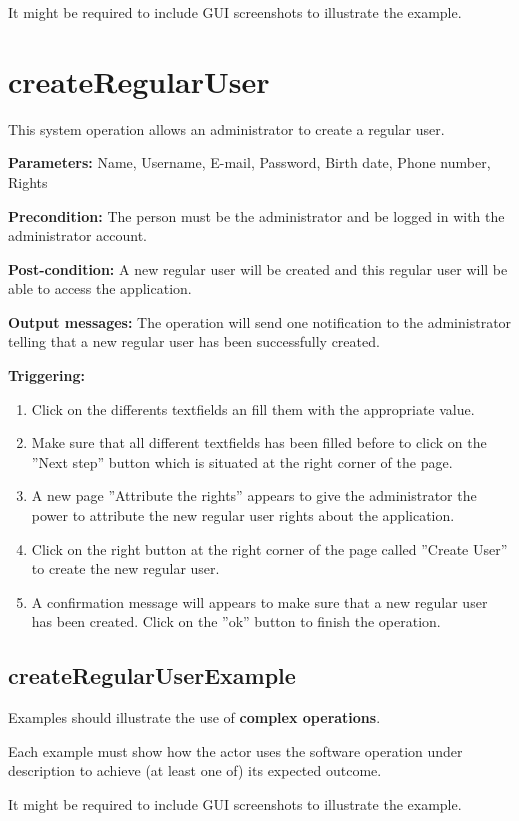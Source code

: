 It might be required to include GUI screenshots to illustrate the example.







\section{createRegularUser}
\label{operation:createRegularUser}
This system operation allows an administrator to create a regular user.

\begin{description}

\item \textbf{Parameters:} Name, Username, E-mail, Password, Birth date, Phone
number, Rights
\item \textbf{Precondition:} The person must be the administrator and be logged
in with the administrator account.
\item \textbf{Post-condition:} A new regular user will be created and this
regular user will be able to access the application.
\item \textbf{Output messages:} The operation will send one notification to the
administrator telling that a new regular user has been successfully created.


\item \textbf{Triggering:}
\begin{enumerate}
\item Click on the differents textfields an fill them with the appropriate
value.
\item Make sure that all different textfields has been filled before to
click on the ''Next step'' button which is situated at the right corner of the
page.
\item A new page ''Attribute the rights'' appears to give the administrator the
power to attribute the new regular user rights about the application.
\item Click on the right button at the right corner of the page called
''Create User'' to create the new regular user.
\item A confirmation message will appears to make sure that a new regular user
has been created. Click on the ''ok'' button to finish the operation.
\end{enumerate}

 
\end{description}

 
\subsection{createRegularUserExample}
Examples should illustrate the use of \textbf{complex operations}.

Each example must show how the actor uses the software operation under
description to achieve (at least one of) its expected outcome.

It might be required to include GUI screenshots to illustrate the example.
